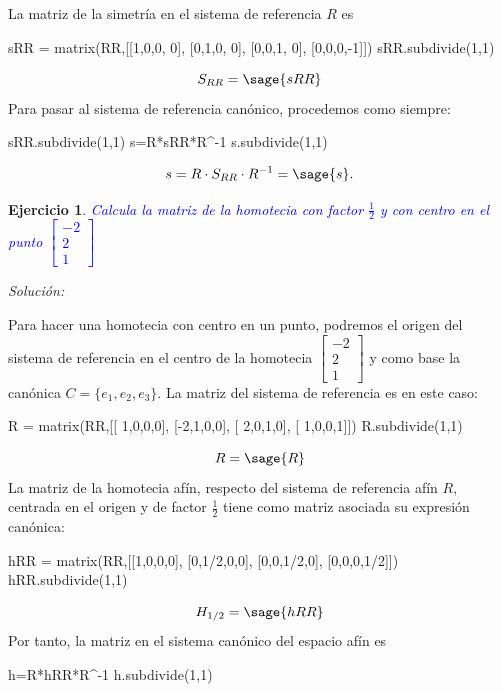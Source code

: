 \documentclass{amsart}
\newtheorem{ejer}{Ejercicio}
\begin{document}
La matriz de la simetría en el sistema de referencia $R$ es
\begin{sageblock}
sRR = matrix(RR,[[1,0,0, 0],
              [0,1,0, 0],
              [0,0,1, 0],
              [0,0,0,-1]])
sRR.subdivide(1,1)
\end{sageblock}
 \[ S_{RR} = \sage{sRR} \]
Para pasar al sistema de referencia canónico, procedemos como siempre:
\begin{sageblock}
sRR.subdivide(1,1)
s=R*sRR*R^-1
s.subdivide(1,1)
\end{sageblock}
 \[ s = R\cdot S_{RR}\cdot R^{-1} = \sage{s}. \]


\newpage

\begin{ejer}
\textcolor{blue}{Calcula la matriz de la homotecia con factor $\frac{1}{2}$ y con centro en el punto $\left[ \begin{array}{r} -2 \\ 2 \\ 1 \end{array} \right]$}
\end{ejer}

{\it Solución:}

Para hacer una homotecia con centro en un punto, podremos el origen del sistema de referencia en el centro de la homotecia $\left[ \begin{array}{r} -2 \\ 2 \\ 1 \end{array} \right]$ y  como base la canónica $C=\{e_1,e_2,e_3\}$. La matriz del sistema de referencia es en este caso:
\begin{sageblock}
R = matrix(RR,[[ 1,0,0,0],
            [-2,1,0,0],
            [ 2,0,1,0],
            [ 1,0,0,1]])
R.subdivide(1,1)
\end{sageblock}
\[ R = \sage{R} \]
La matriz de la homotecia afín, respecto del sistema de referencia afín $R$, centrada en el origen y de factor $\frac{1}{2}$ tiene como matriz asociada su expresión canónica:
\begin{sageblock}
hRR = matrix(RR,[[1,0,0,0],
              [0,1/2,0,0],
              [0,0,1/2,0],
              [0,0,0,1/2]])
hRR.subdivide(1,1)
\end{sageblock}
\[ H_{1/2} = \sage{hRR} \] 
Por tanto, la matriz en el sistema canónico del espacio afín es
\begin{sageblock}
h=R*hRR*R^-1
h.subdivide(1,1)
\end{sageblock}
\end{document}
